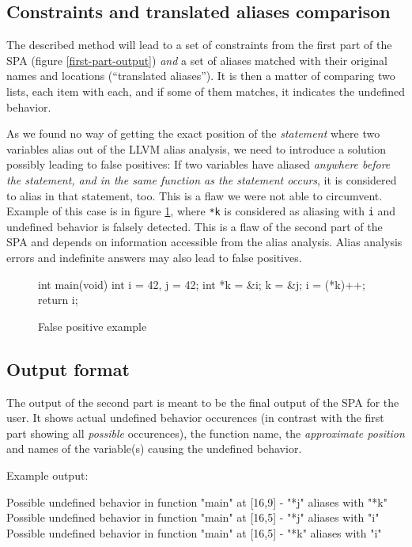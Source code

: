 \subsection{Constraints and translated aliases comparison}\label{flaw}
The described method will lead to a set of constraints from the first part of the SPA (figure \ref{first-part-output}) \emph{and} a set of aliases matched with their original names and locations (``translated aliases''). It is then a matter of comparing two lists, each item with each, and if some of them matches, it indicates the undefined behavior.

As we found no way of getting the exact position of the \emph{statement} where two variables alias out of the LLVM alias analysis, we need to introduce a solution possibly leading to false positives: If two variables have aliased \emph{anywhere before the statement, and in the same function as the statement occurs}, it is considered to alias in that statement, too. This is a flaw we were not able to circumvent. Example of this case is in figure \ref{example-alias-before}, where \verb|*k| is considered as aliasing with \verb|i| and undefined behavior is falsely detected. This is a flaw of the second part of the SPA and depends on information accessible from the alias analysis. Alias analysis errors and indefinite answers may also lead to false positives.
\begin{figure}
\caption{False positive example}
\label{example-alias-before}
\begin{code}
int main(void){
  int i = 42, j = 42;
  int *k = &i;
  k = &j;
  i = (*k)++;
  return i;
}
\end{code}
\end{figure}
\subsection{Output format}
The output of the second part is meant to be the final output of the SPA for the user. It shows actual undefined behavior occurences (in contrast with the first part showing all \emph{possible} occurences), the function name, the \emph{approximate position} and names of the variable(s) causing the undefined behavior.

Example output:
\\\begin{code}
Possible undefined behavior in function "main" at [16,9] - "*j" aliases with "*k"
Possible undefined behavior in function "main" at [16,5] - "*j" aliases with "i"
Possible undefined behavior in function "main" at [16,5] - "*k" aliases with "i"
\end{code}

